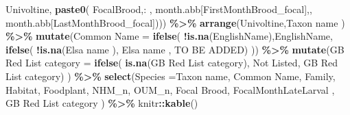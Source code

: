 \documentclass[
]{article}
\newenvironment{Shaded}{\begin{snugshade}}{\end{snugshade}}
\newcommand{\AttributeTok}[1]{\textcolor[rgb]{0.13,0.29,0.53}{#1}}
\newcommand{\FunctionTok}[1]{\textcolor[rgb]{0.13,0.29,0.53}{\textbf{#1}}}
\newcommand{\NormalTok}[1]{#1}
\newcommand{\OtherTok}[1]{\textcolor[rgb]{0.56,0.35,0.01}{#1}}
\newcommand{\SpecialCharTok}[1]{\textcolor[rgb]{0.81,0.36,0.00}{\textbf{#1}}}
\newcommand{\StringTok}[1]{\textcolor[rgb]{0.31,0.60,0.02}{#1}}
\begin{document}
\begin{Shaded}
\begin{Highlighting}[]
                                 \StringTok{\textquotesingle{}Univoltine\textquotesingle{}}\NormalTok{,}
                                 \FunctionTok{paste0}\NormalTok{( FocalBrood,}\StringTok{\textquotesingle{}: \textquotesingle{}}\NormalTok{,}
\NormalTok{                                         month.abb[FirstMonthBrood\_focal],}\StringTok{\textquotesingle{}{-}\textquotesingle{}}\NormalTok{,}
\NormalTok{                                         month.abb[LastMonthBrood\_focal]))) }\SpecialCharTok{\%\textgreater{}\%}
  \FunctionTok{arrange}\NormalTok{(Univoltine,}\StringTok{\textasciigrave{}}\AttributeTok{Taxon name}\StringTok{\textasciigrave{}}\NormalTok{ ) }\SpecialCharTok{\%\textgreater{}\%}
  \FunctionTok{mutate}\NormalTok{(}\StringTok{\textasciigrave{}}\AttributeTok{Common Name}\StringTok{\textasciigrave{}} \OtherTok{=} \FunctionTok{ifelse}\NormalTok{( }\SpecialCharTok{!}\FunctionTok{is.na}\NormalTok{(EnglishName),EnglishName,}
                                 \FunctionTok{ifelse}\NormalTok{( }\SpecialCharTok{!}\FunctionTok{is.na}\NormalTok{(}\StringTok{\textasciigrave{}}\AttributeTok{Elsa name}\StringTok{\textasciigrave{}}\NormalTok{ ),}
                                         \StringTok{\textasciigrave{}}\AttributeTok{Elsa name}\StringTok{\textasciigrave{}}\NormalTok{ ,}
                                         \StringTok{\textquotesingle{}TO BE ADDED\textquotesingle{}}\NormalTok{) )) }\SpecialCharTok{\%\textgreater{}\%} 
  \FunctionTok{mutate}\NormalTok{(}\StringTok{\textasciigrave{}}\AttributeTok{GB Red List category}\StringTok{\textasciigrave{}} \OtherTok{=} \FunctionTok{ifelse}\NormalTok{( }\FunctionTok{is.na}\NormalTok{(}\StringTok{\textasciigrave{}}\AttributeTok{GB Red List category}\StringTok{\textasciigrave{}}\NormalTok{),}
                                          \StringTok{\textquotesingle{}Not Listed\textquotesingle{}}\NormalTok{,}
                                          \StringTok{\textasciigrave{}}\AttributeTok{GB Red List category}\StringTok{\textasciigrave{}}\NormalTok{) ) }\SpecialCharTok{\%\textgreater{}\%}
  \FunctionTok{select}\NormalTok{(}\AttributeTok{Species =}\StringTok{\textasciigrave{}}\AttributeTok{Taxon name}\StringTok{\textasciigrave{}}\NormalTok{,}
         \StringTok{\textasciigrave{}}\AttributeTok{Common Name}\StringTok{\textasciigrave{}}\NormalTok{,}
\NormalTok{         Family,}
\NormalTok{         Habitat,}
\NormalTok{         Foodplant,}
\NormalTok{         NHM\_n,}
\NormalTok{         OUM\_n,}
         \StringTok{\textasciigrave{}}\AttributeTok{Focal Brood}\StringTok{\textasciigrave{}}\NormalTok{,}
\NormalTok{         FocalMonthLateLarval ,}
         \StringTok{\textasciigrave{}}\AttributeTok{GB Red List category}\StringTok{\textasciigrave{}}\NormalTok{ ) }\SpecialCharTok{\%\textgreater{}\%}
\NormalTok{  knitr}\SpecialCharTok{::}\FunctionTok{kable}\NormalTok{()}
\end{Highlighting}
\end{Shaded}
\end{document}
